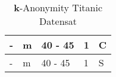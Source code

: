 \begin{table}[!htb]
\begin{tabular}{lllll}
\multicolumn{1}{|l|}{-}                                     & \multicolumn{1}{l|}{m}                                  & \multicolumn{1}{l|}{40 - 45}                       & \multicolumn{1}{l|}{1}                                      & \multicolumn{1}{l|}{C}                                          \\ \hline
\multicolumn{1}{|l|}{-}                                     & \multicolumn{1}{l|}{m}                                  & \multicolumn{1}{l|}{40 - 45}                       & \multicolumn{1}{l|}{1}                                      & \multicolumn{1}{l|}{S}                                          \\ \hline
\end{tabular}
\caption{\textbf{k}-Anonymity Titanic Datensat \cite{P-23}\cite{D-titanic}}
\label{tab:k-ano-titanic}
\end{table}